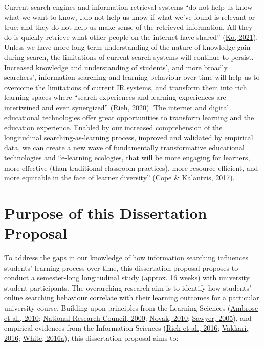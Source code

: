 \documentclass[letterpaper, nobind]{templates/ociamthesis}
\begin{document}
Current search engines and information retrieval systems ``do not help us know what we want to know, \ldots do not help us know if what we've found is relevant or true; and they do not help us make sense of the retrieved information.
All they do is quickly retrieve what other people on the internet have shared'' (\protect\hyperlink{ref-ko2021seeking}{Ko, 2021}).
Unless we have more long-term understanding of the nature of knowledge gain during search, the limitations of current search systems will continue to persist.
Increased knowledge and understanding of students', and more broadly searchers', information searching and learning behaviour over time will help us to overcome the limitations of current IR systems, and transform them into rich learning spaces where ``search experiences and learning experiences are intertwined and even synergized'' (\protect\hyperlink{ref-url_rieh_homepage}{Rieh, 2020}).
The internet and digital educational technologies offer great opportunities to transform learning and the education experience.
Enabled by our increased comprehension of the longitudinal searching-as-learning process, improved and validated by empirical data, we can create a new wave of fundamentally transformative educational technologies and ``e-learning ecologies, that will be more engaging for learners, more effective (than traditional classroom practices), more resource efficient, and more equitable in the face of learner diversity'' (\protect\hyperlink{ref-cope2017elearningc}{Cope \& Kalantzis, 2017}).

\hypertarget{sec-intro-purpose}{%
\section{Purpose of this Dissertation Proposal}\label{sec-intro-purpose}}

To address the gaps in our knowledge of how information searching influences students' learning process over time, this dissertation proposal proposes to conduct a semester-long longitudinal study (approx. 16 weeks) with university student participants.
The overarching research aim is to identify how students' online searching behaviour correlate with their learning outcomes for a particular university course.
Building upon principles from the Learning Sciences (\protect\hyperlink{ref-ambrose2010howa}{Ambrose et al., 2010}; \protect\hyperlink{ref-council2000how}{National Research Council, 2000}; \protect\hyperlink{ref-novak2010learninga}{Novak, 2010}; \protect\hyperlink{ref-sawyer2005cambridge}{Sawyer, 2005}),
and empirical evidences from the Information Sciences (\protect\hyperlink{ref-rieh2016searching}{Rieh et al., 2016}; \protect\hyperlink{ref-vakkari2016searching}{Vakkari, 2016}; \protect\hyperlink{ref-white2016interactions}{White, 2016a}),
this dissertation proposal aims to:
\end{document}
